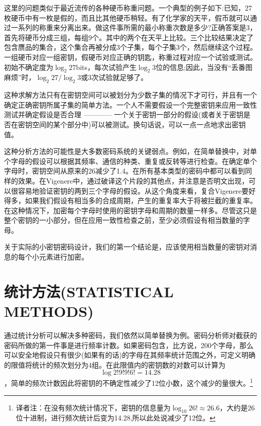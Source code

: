 \documentclass[]{article}
\begin{document}
这里的问题类似于最近流传的各种硬币称重问题。一个典型的例子如下:已知，27枚硬币中有一枚是假的，而且比其他硬币稍轻。有了化学家的天平，假币就可以通过一系列的称重来分离出来。做这件事所需的最小称重次数是多少?正确答案是3，首先将硬币分成三组，每组9个。其中的两个在天平上比较。三个比较结果决定了包含赝品的集合，这个集合再被分成3个子集，每个子集3个，然后继续这个过程。一组硬币对应一组密钥，假硬币对应正确的钥匙，称重过程对应一个试验或测试。初始不确定度为$\log_2{27}$bits，每次试验产生$\log_2{3}$位的信息;因此，当没有“丢番图麻烦”时，$\log_2{27}/\log_2{3}$或3次试验就足够了。

这种求解方法只有在密钥空间可以被划分为少数子集的情况下才可行，并且有一个确定正确密钥所属子集的简单方法。一个人不需要假设一个完整密钥来应用一致性测试并确定假设是否合理 ———— 一个关于密钥一部分的假设(或者关于密钥是否在密钥空间的某个部分中)可以被测试。换句话说，可以一点一点地求出密钥值。

这种分析方法的可能性是大多数密码系统的关键弱点。例如，在简单替换中，对单个字母的假设可以根据其频率、通信的种类、重复或反转等进行检查。在确定单个字母时，密钥空间从原来的26减少了1.4。在所有基本类型的密码中都可以看到同样的效果。在Vigenere中，通过破译这个片段的其他点，并注意是否明文出现，可以很容易地验证密钥的两到三个字母的假设。从这个角度来看，复合Vigenere要好得多，如果我们假设有相当多的合成周期，产生的重复率大于将被拦截的重复率。在这种情况下，加密每个字母时使用的密钥字母和周期的数量一样多。尽管这只是整个密钥的一小部分，但在应用一致性检查之前，至少必须假设有相当数量的字母。

关于实际的小密钥密码设计，我们的第一个结论是，应该使用相当数量的密钥对消息的每个小元素进行加密。

\newpage
%   
%

\section{统计方法(STATISTICAL METHODS)}

通过统计分析可以解决多种密码，我们依然以简单替换为例。密码分析师对截获的密码所做的第一件事是进行频率计数。如果密码包含，比方说，200个字母，那么可以安全地假设只有很少(如果有的话)的字母在其频率统计范围之外，可定义明确的限值将统计的频次划分为4组。在此限值内的密钥数的对数可以计算为
\[\log{2!9!9!6!}=14.28\]
，简单的频次计数因此将密钥的不确定性减少了12位小数，这个减少的量很大。\footnote{译者注：在没有频次统计情况下，密钥的信息量为$\log_{10}{26!}\approx 26.6$，大约是26位十进制，进行频次统计后变为14.28,所以此处说减少了12位。}
\end{document}
